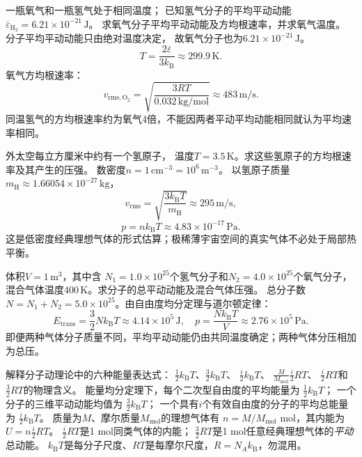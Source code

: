 \problemtext 一瓶氧气和一瓶氢气处于相同温度；
已知氢气分子的平均平动动能
$\overline\varepsilon_{\mathrm H_2}=6.21\times10^{-21}\,\mathrm J$。
求氧气分子平均平动动能及方均根速率，并求氧气温度。
\workings
分子平均平动动能只由绝对温度决定，
故氧气分子也为$\boxed{6.21\times10^{-21}\,\mathrm J}$。
\[
T=\frac{2\overline\varepsilon}{3k_{\mathrm B}}
\approx\boxed{299.9\,\mathrm K}.
\]
氧气方均根速率：
\[
\boxed{v_{\mathrm{rms,O_2}}
=\sqrt{\frac{3RT}{0.032\,\mathrm{kg/mol}}}
\approx483\,\mathrm{m/s}}.
\]
\crosscheck 同温氢气的方均根速率约为氧气4倍，不能因两者平动平均动能相同就认为平均速率相同。

\problemtext 外太空每立方厘米中约有一个氢原子，
温度$T=3.5\,\mathrm K$。求这些氢原子的方均根速率及其产生的压强。
\workings
数密度$n=1\,\mathrm{cm^{-3}}=10^6\,\mathrm{m^{-3}}$。
以氢原子质量$m_{\mathrm H}\approx1.66054\times10^{-27}\,\mathrm{kg}$，
\[
\boxed{v_{\mathrm{rms}}
=\sqrt{\frac{3k_{\mathrm B}T}{m_{\mathrm H}}}
\approx295\,\mathrm{m/s}},
\]
\[
\boxed{p=nk_{\mathrm B}T\approx4.83\times10^{-17}\,\mathrm{Pa}}.
\]
\crosscheck 这是低密度经典理想气体的形式估算；极稀薄宇宙空间的真实气体不必处于局部热平衡。

\problemtext 体积$V=1\,\mathrm{m^3}$，其中含
$N_1=1.0\times10^{25}$个氢气分子和$N_2=4.0\times10^{25}$个氧气分子，
混合气体温度$400\,\mathrm K$。求分子的总平动动能及混合气体压强。
\workings
总分子数$N=N_1+N_2=5.0\times10^{25}$。由自由度均分定理与道尔顿定律：
\[
\boxed{E_{\mathrm{trans}}=\frac32Nk_{\mathrm B}T
\approx4.14\times10^5\,\mathrm J},
\quad
\boxed{p=\frac{Nk_{\mathrm B}T}{V}
\approx2.76\times10^5\,\mathrm{Pa}}.
\]
\crosscheck 即便两种气体分子质量不同，平均平动动能仍由共同温度确定；两种气体分压相加为总压。

\problemtext 解释分子动理论中的六种能量表达式：
$\frac12k_{\mathrm B}T$、$\frac32k_{\mathrm B}T$、
$\frac i2k_{\mathrm B}T$、
$\frac{M}{M_{\mathrm{mol}}}\frac i2RT$、
$\frac i2RT$和$\frac32RT$的物理含义。
\workings
能量均分定理下，每个二次型自由度的平均能量为
$\boxed{\frac12k_{\mathrm B}T}$；
一个分子的三维平动动能均值为
$\boxed{\frac32k_{\mathrm B}T}$；
一个具有$i$个有效自由度的分子的平均总能量为
$\boxed{\frac i2k_{\mathrm B}T}$。
质量为$M$、摩尔质量$M_{\mathrm{mol}}$的理想气体有
$n=M/M_{\mathrm{mol}}$ mol，其内能为
$\boxed{U=n\frac i2RT}$。
$\frac i2RT$是1 mol同类气体的内能；
$\frac32RT$是1 mol任意经典理想气体的\emph{平动}总动能。
\crosscheck $k_{\mathrm B}T$是每分子尺度、$RT$是每摩尔尺度，$R=N_Ak_{\mathrm B}$，勿混用。

